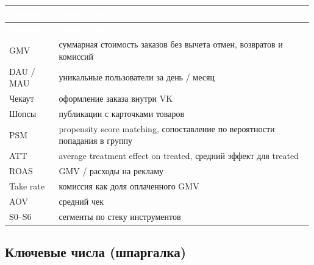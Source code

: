 \documentclass[10pt,a4paper]{article}
\begin{document}
\begingroup
\small
\setlength{\tabcolsep}{3pt}
\renewcommand{\arraystretch}{1.12}
\begin{longtable}{@{}>{\raggedright\arraybackslash}p{0.1616\linewidth}>{\raggedright\arraybackslash}p{0.8261\linewidth}@{}}
\rowcolor{blue}
\textcolor{white}{\textbf{Термин}} & \textcolor{white}{\textbf{Определение}} \\
\endfirsthead
\rowcolor{blue}
\textcolor{white}{\textbf{Термин}} & \textcolor{white}{\textbf{Определение}} \\
\endhead
\hline
GMV & суммарная стоимость заказов без вычета отмен, возвратов и комиссий \\
DAU / MAU & уникальные пользователи за день / месяц \\
Чекаут & оформление заказа внутри VK \\
Шопсы & публикации с карточками товаров \\
PSM & propensity score matching, сопоставление по вероятности попадания в группу \\
ATT & average treatment effect on treated, средний эффект для treated \\
ROAS & GMV / расходы на рекламу \\
Take rate & комиссия как доля оплаченного GMV \\
AOV & средний чек \\
S0–S6 & сегменты по стеку инструментов \\
\hline
\end{longtable}
\endgroup
\vspace{4pt}

\subsection{Ключевые числа (шпаргалка)}
\end{document}

